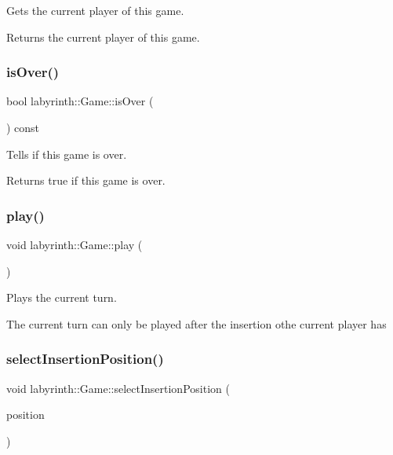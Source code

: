 Gets the current player of this game. 

\begin{DoxyReturn}{Returns}
the current player of this game. 
\end{DoxyReturn}
\mbox{\label{classlabyrinth_1_1_game_a33b108f397247235704d0cab30e59bfd}} 
\subsubsection{\texorpdfstring{isOver()}{isOver()}}
{\footnotesize\ttfamily bool labyrinth\+::\+Game\+::is\+Over (\begin{DoxyParamCaption}{ }\end{DoxyParamCaption}) const}



Tells if this game is over. 

\begin{DoxyReturn}{Returns}
true if this game is over. 
\end{DoxyReturn}
\mbox{\label{classlabyrinth_1_1_game_a44715f5e2e8f893787a78c0aa9d92868}} 
\subsubsection{\texorpdfstring{play()}{play()}}
{\footnotesize\ttfamily void labyrinth\+::\+Game\+::play (\begin{DoxyParamCaption}{ }\end{DoxyParamCaption})}



Plays the current turn. 

The current turn can only be played after the insertion othe current player has \mbox{\label{classlabyrinth_1_1_game_a4c0715b9d9307fde5fb026d6acf8acc9}} 
\subsubsection{\texorpdfstring{selectInsertionPosition()}{selectInsertionPosition()}}
{\footnotesize\ttfamily void labyrinth\+::\+Game\+::select\+Insertion\+Position (\begin{DoxyParamCaption}\item[{const Maze\+Position \&}]{position }\end{DoxyParamCaption})}



